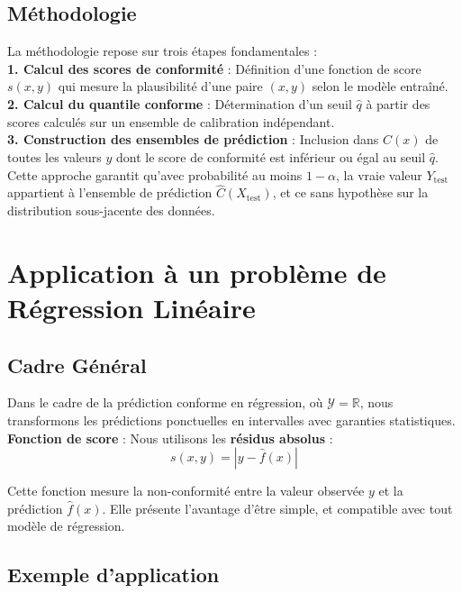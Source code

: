 \documentclass[a4paper,12pt]{article}
\begin{document}
\subsection{Méthodologie}
La méthodologie repose sur trois étapes fondamentales :\\

\textbf{1. Calcul des scores de conformité} : Définition d'une fonction de score $s(x,y)$ qui mesure la plausibilité d'une paire $(x,y)$ selon le modèle entraîné.\\

\textbf{2. Calcul du quantile conforme} : Détermination d'un seuil $\hat{q}$ à partir des scores calculés sur un ensemble de calibration indépendant.\\

\textbf{3. Construction des ensembles de prédiction} : Inclusion dans $\hat{C}(x)$ de toutes les valeurs $y$ dont le score de conformité est inférieur ou égal au seuil $\hat{q}$.\\

Cette approche garantit qu'avec probabilité au moins $1-\alpha$, la vraie valeur $Y_{\text{test}}$ appartient à l'ensemble de prédiction $\hat{C}(X_{\text{test}})$, et ce sans hypothèse sur la distribution sous-jacente des données.

\section{Application à un problème de Régression Linéaire}

\subsection{Cadre Général}

Dans le cadre de la prédiction conforme en régression, où $\mathcal{Y} = \mathbb{R}$, nous transformons les prédictions ponctuelles en intervalles avec garanties statistiques.\\

\textbf{Fonction de score} : Nous utilisons les \textbf{résidus absolus} :
$$s(x, y) = |y - \hat{f}(x)|$$

Cette fonction mesure la non-conformité entre la valeur observée $y$ et la prédiction $\hat{f}(x)$. Elle présente l'avantage d'être simple, et compatible avec tout modèle de régression.

\subsection{Exemple d'application}
\end{document}
